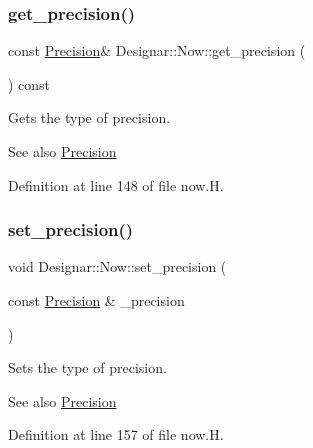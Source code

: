 \subsubsection{\texorpdfstring{get\+\_\+precision()}{get\_precision()}}
{\footnotesize\ttfamily const \hyperlink{class_designar_1_1_now_a3c9f5e57907c88cbe63c70a64638c072}{Precision}\& Designar\+::\+Now\+::get\+\_\+precision (\begin{DoxyParamCaption}{ }\end{DoxyParamCaption}) const\hspace{0.3cm}{\ttfamily [inline]}}

Gets the type of precision.

\begin{DoxySeeAlso}{See also}
\hyperlink{class_designar_1_1_now_a3c9f5e57907c88cbe63c70a64638c072}{Precision} 
\end{DoxySeeAlso}


Definition at line 148 of file now.\+H.

\mbox{\label{class_designar_1_1_now_aab4958d10eb970d40f3dcdf78a5f42e3}} 
\subsubsection{\texorpdfstring{set\+\_\+precision()}{set\_precision()}}
{\footnotesize\ttfamily void Designar\+::\+Now\+::set\+\_\+precision (\begin{DoxyParamCaption}\item[{const \hyperlink{class_designar_1_1_now_a3c9f5e57907c88cbe63c70a64638c072}{Precision} \&}]{\+\_\+precision }\end{DoxyParamCaption})\hspace{0.3cm}{\ttfamily [inline]}}

Sets the type of precision.

\begin{DoxySeeAlso}{See also}
\hyperlink{class_designar_1_1_now_a3c9f5e57907c88cbe63c70a64638c072}{Precision} 
\end{DoxySeeAlso}


Definition at line 157 of file now.\+H.

\mbox{\label{class_designar_1_1_now_a7ccb419799b46b7786b9ad0ac231de14}} 
